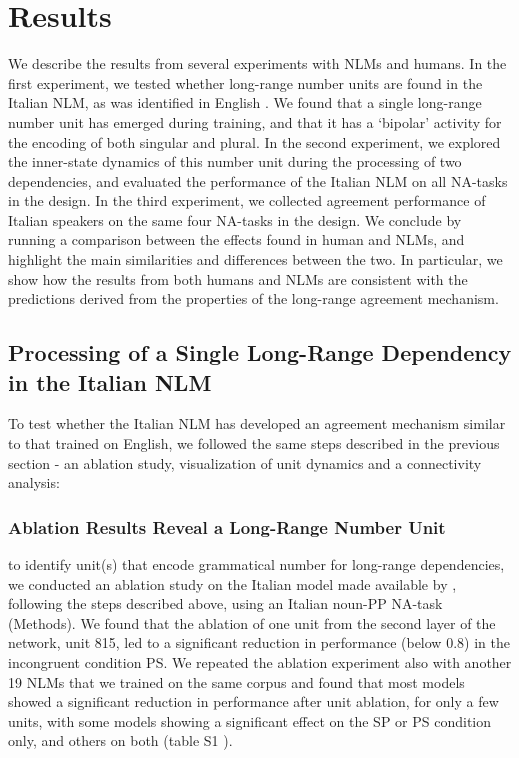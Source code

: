 \section{Results}
We describe the results from several experiments with NLMs and humans. In the first experiment, we tested whether long-range number units are found in the Italian NLM, as was identified in English \citep{lakretz2019emergence}. We found that a single long-range number unit has emerged during training, and that it has a `bipolar' activity for the encoding of both singular and plural. In the second experiment, we explored the inner-state dynamics of this number unit during the processing of two dependencies, and evaluated the performance of the Italian NLM on all NA-tasks in the design. In the third experiment, we collected agreement performance of Italian speakers on the same four NA-tasks in the design. We conclude by running a comparison between the effects found in human and NLMs, and highlight the main similarities and differences between the two. In particular, we show how the results from both humans and NLMs are consistent with the predictions derived from the properties of the long-range agreement mechanism. 

\subsection{Processing of a Single Long-Range Dependency in the Italian NLM}
To test whether the Italian NLM has developed an agreement mechanism similar to that trained on English, we followed the same steps described in the previous section - an ablation study, visualization of unit dynamics and a connectivity analysis:

\subsubsection{Ablation Results Reveal a Long-Range Number Unit} to identify unit(s) that encode grammatical number for long-range dependencies, we conducted an ablation study on the Italian model made available by \citet{Gulordava:etal:2018}, following the steps described above, using an Italian noun-PP NA-task (Methods). We found that the ablation of one unit from the second layer of the network, unit 815, led to a significant reduction in performance (below 0.8) in the incongruent condition PS. We repeated the ablation experiment also with another 19 NLMs that we trained on the same corpus and found that most models showed a significant reduction in performance after unit ablation, for only a few units, with some models showing a significant effect on the SP or PS condition only, and others on both (table S1 ).

